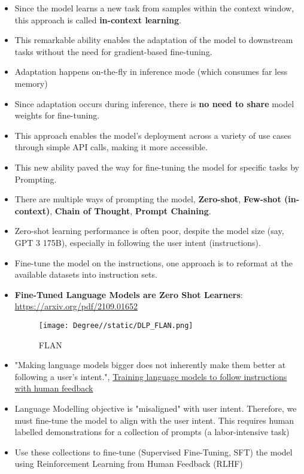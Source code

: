 \documentclass[a4paper]{article}
\begin{document}
\begin{itemize}
    \item Since the model learns a new task from samples within the context window, this approach is called \textbf{in-context learning}.
    \item This remarkable ability enables the adaptation of the model to downstream tasks without the need for gradient-based fine-tuning.
    \item Adaptation happens on-the-fly in inference mode (which consumes far less memory)
    \item Since adaptation occurs during inference, there is \textbf{ no need to share} model weights for fine-tuning.
    \item This approach enables the model's deployment across a variety of use cases through simple API calls, making it more accessible.
    \item This new ability paved the way for fine-tuning the model for specific tasks by Prompting.
    \item There are multiple ways of prompting the model, \textbf{Zero-shot}, \textbf{Few-shot (in-context)}, \textbf{Chain of Thought}, \textbf{Prompt Chaining}.
    \item Zero-shot learning performance is often poor, despite the model size (say, GPT 3 175B), especially in following the user intent (instructions).
    \item Fine-tune the model on the instructions, one approach is to reformat at the available datasets into instruction sets.
    \item \textbf{Fine-Tuned Language Models are Zero Shot Learners}: \url{https://arxiv.org/pdf/2109.01652}
    \begin{figure}[H]
        \centering
        \texttt{[image: Degree//static/DLP\_FLAN.png]}
        \caption{FLAN}
    \end{figure}
    \item "Making language models bigger does not inherently make them better at following a user’s intent.", \href{https://arxiv.org/pdf/2203.02155}{Training language models to follow instructions with human feedback}
    \item Language Modelling objective is "misaligned" with user intent. Therefore, we must fine-tune the model to align with the user intent. This requires human labelled demonstrations for a collection of prompts (a labor-intensive task)
    \item Use these collections to fine-tune (Supervised Fine-Tuning, SFT) the model using Reinforcement Learning from Human Feedback (RLHF)

\end{itemize}
\end{document}
